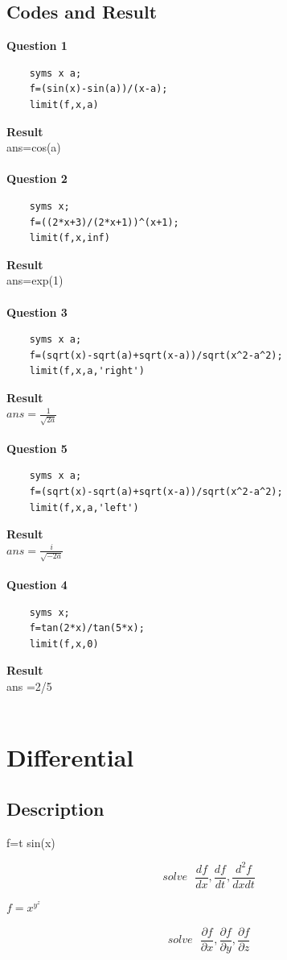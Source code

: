 \documentclass[UTF8,a4paper]{article}
\begin{document}
\subsection{Codes and Result}
\textbf{Question 1}
\begin{lstlisting}
    syms x a;
    f=(sin(x)-sin(a))/(x-a);
    limit(f,x,a)
\end{lstlisting}
\textbf{Result}\\
ans=cos(a)\\\\
\textbf{Question 2}\\
\begin{lstlisting}
    syms x;
    f=((2*x+3)/(2*x+1))^(x+1);
    limit(f,x,inf)
\end{lstlisting}
\textbf{Result}\\
ans=exp(1)\\\\
\textbf{Question 3}
\begin{lstlisting}
    syms x a;
    f=(sqrt(x)-sqrt(a)+sqrt(x-a))/sqrt(x^2-a^2);
    limit(f,x,a,'right')    
\end{lstlisting}
\textbf{Result}\\
$ans =\frac{1}{\sqrt{2a}}$\\\\
\textbf{Question 5}\\
\begin{lstlisting}
    syms x a;
    f=(sqrt(x)-sqrt(a)+sqrt(x-a))/sqrt(x^2-a^2);
    limit(f,x,a,'left')
\end{lstlisting}
\textbf{Result}\\
$ans =\frac{i}{\sqrt{-2a}}$\\\\
\textbf{Question 4}\\
\begin{lstlisting}
    syms x;
    f=tan(2*x)/tan(5*x);
    limit(f,x,0)    
\end{lstlisting}
\textbf{Result}\\
ans =2/5\\\\

\section{Differential}
\subsection{Description}
\begin{center}
{f}={t} sin(x)\\
\end{center}
$$
solve~~~\frac{df}{dx},\frac{df}{dt},\frac{d^2f}{dxdt}
$$
\begin{center}
    ${f}=x^{y^z}$\\
\end{center}
$$
solve~~~\frac{\partial f}{\partial x},\frac{\partial f}{\partial y},\frac{\partial f}{\partial z}
$$
\end{document}
